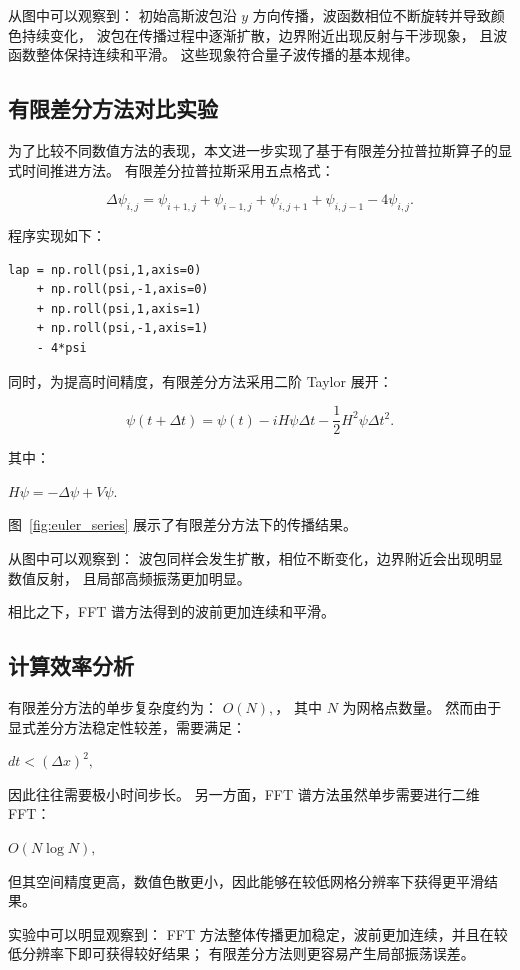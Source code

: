 \documentclass[UTF8,a4paper,12pt]{ctexart}
\begin{document}
从图中可以观察到：
初始高斯波包沿 $y$ 方向传播，波函数相位不断旋转并导致颜色持续变化，
波包在传播过程中逐渐扩散，边界附近出现反射与干涉现象，
且波函数整体保持连续和平滑。
这些现象符合量子波传播的基本规律。

\subsection{有限差分方法对比实验}

为了比较不同数值方法的表现，本文进一步实现了基于有限差分拉普拉斯算子的显式时间推进方法。
有限差分拉普拉斯采用五点格式：

\[
\Delta \psi_{i,j}
=
\psi_{i+1,j}
+
\psi_{i-1,j}
+
\psi_{i,j+1}
+
\psi_{i,j-1}
-
4\psi_{i,j}.
\]

程序实现如下：

\begin{verbatim}
lap = np.roll(psi,1,axis=0)
    + np.roll(psi,-1,axis=0)
    + np.roll(psi,1,axis=1)
    + np.roll(psi,-1,axis=1)
    - 4*psi
\end{verbatim}

同时，为提高时间精度，有限差分方法采用二阶 Taylor 展开：

\[
\psi(t+\Delta t)
=
\psi(t)
-
iH\psi \Delta t
-
\frac12 H^2\psi \Delta t^2.
\]

其中：

$H\psi=-\Delta\psi+V\psi.$

图~\ref{fig:euler_series} 展示了有限差分方法下的传播结果。

从图中可以观察到：
波包同样会发生扩散，相位不断变化，边界附近会出现明显数值反射，
且局部高频振荡更加明显。

相比之下，FFT 谱方法得到的波前更加连续和平滑。

\subsection{计算效率分析}

有限差分方法的单步复杂度约为：
$O(N),$，
其中 $N$ 为网格点数量。
然而由于显式差分方法稳定性较差，需要满足：

$dt < (\Delta x)^2,$

因此往往需要极小时间步长。
另一方面，FFT 谱方法虽然单步需要进行二维 FFT：

$O(N\log N),$

但其空间精度更高，数值色散更小，因此能够在较低网格分辨率下获得更平滑结果。

实验中可以明显观察到：
FFT 方法整体传播更加稳定，波前更加连续，并且在较低分辨率下即可获得较好结果；
有限差分方法则更容易产生局部振荡误差。
\end{document}
